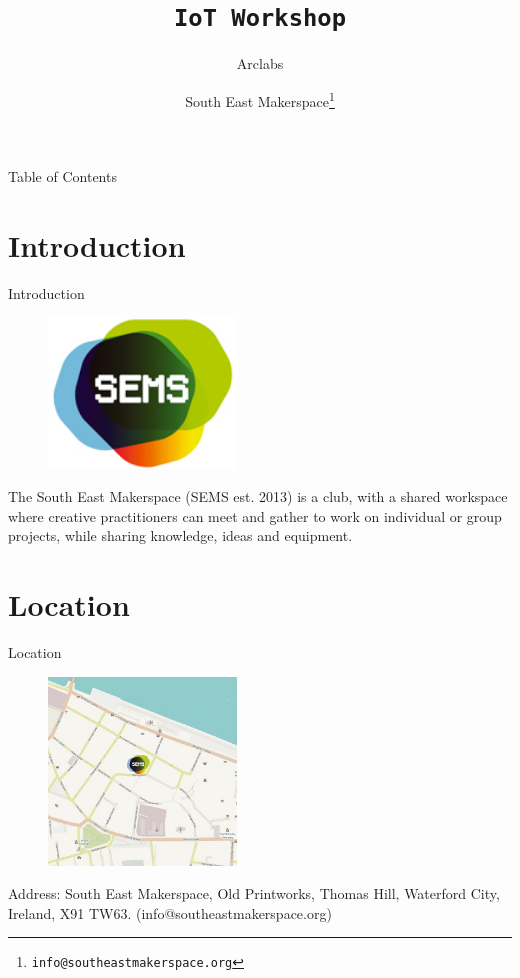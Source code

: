 \documentclass{beamer}
\title{\texttt{IoT Workshop}}
\subtitle{Arclabs}
\author{South East Makerspace\footnote{\texttt{info@southeastmakerspace.org}}}
\begin{document}
\begin{frame}
  \maketitle
\end{frame}


\begin{frame}{Table of Contents}
  \tableofcontents
\end{frame}

\section{Introduction}
\begin{frame}{Introduction}
%
\begin{figure}
	\centering
	\includegraphics[width=5cm]{images/test}
	\label{fig:logo}
\end{figure}
%

The South East Makerspace (SEMS est. 2013) is a club, with a shared workspace where creative practitioners can meet and gather to work on individual or group projects, while sharing knowledge, ideas and equipment.
\end{frame}


\section{Location}
\begin{frame}{Location}
	\begin{figure}
		\centering
		\includegraphics[width=5cm]{images/sems_1}
		\label{fig:logo}
	\end{figure}
	
	Address: South East Makerspace, Old Printworks, Thomas Hill, Waterford City, Ireland, X91 TW63. (info@southeastmakerspace.org)
\end{frame}
\end{document}
